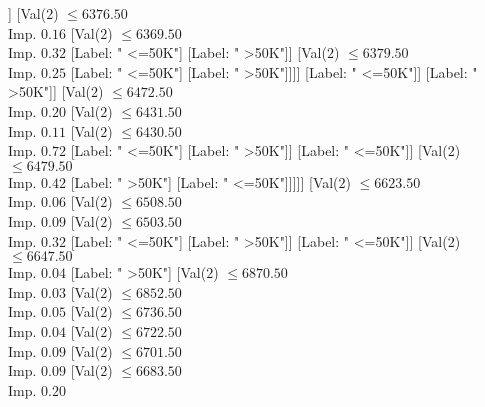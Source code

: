 \documentclass[margin=10pt]{standalone}
\begin{document}
\begin{forest}
																														[Label: " >50K"]
																														[Label: " <=50K"]]
																													[Val($2$) $ \leq 6376.50$ \\ Imp. $0.16$
																														[Val($2$) $ \leq 6369.50$ \\ Imp. $0.32$
																															[Label: " <=50K"]
																															[Label: " >50K"]]
																														[Val($2$) $ \leq 6379.50$ \\ Imp. $0.25$
																															[Label: " <=50K"]
																															[Label: " >50K"]]]]
																												[Label: " <=50K"]]
																											[Label: " >50K"]]
																										[Val($2$) $ \leq 6472.50$ \\ Imp. $0.20$
																											[Val($2$) $ \leq 6431.50$ \\ Imp. $0.11$
																												[Val($2$) $ \leq 6430.50$ \\ Imp. $0.72$
																													[Label: " <=50K"]
																													[Label: " >50K"]]
																												[Label: " <=50K"]]
																											[Val($2$) $ \leq 6479.50$ \\ Imp. $0.42$
																												[Label: " >50K"]
																												[Label: " <=50K"]]]]]
																								[Val($2$) $ \leq 6623.50$ \\ Imp. $0.06$
																									[Val($2$) $ \leq 6508.50$ \\ Imp. $0.09$
																										[Val($2$) $ \leq 6503.50$ \\ Imp. $0.32$
																											[Label: " <=50K"]
																											[Label: " >50K"]]
																										[Label: " <=50K"]]
																									[Val($2$) $ \leq 6647.50$ \\ Imp. $0.04$
																										[Label: " >50K"]
																										[Val($2$) $ \leq 6870.50$ \\ Imp. $0.03$
																											[Val($2$) $ \leq 6852.50$ \\ Imp. $0.05$
																												[Val($2$) $ \leq 6736.50$ \\ Imp. $0.04$
																													[Val($2$) $ \leq 6722.50$ \\ Imp. $0.09$
																														[Val($2$) $ \leq 6701.50$ \\ Imp. $0.09$
																															[Val($2$) $ \leq 6683.50$ \\ Imp. $0.20$

\end{forest}
\end{document}
